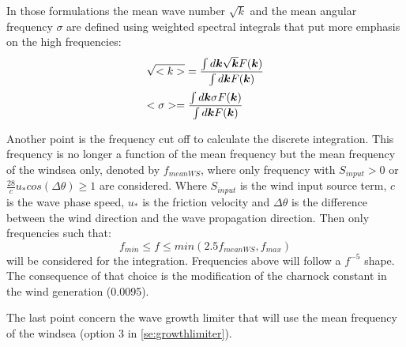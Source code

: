  In those formulations the mean wave number $\sqrt{k}$
 and the mean angular frequency $\sigma$ are defined using weighted spectral integrals that put more emphasis on the high frequencies:
$$
\barr{l}
\dsp \sqrt{<k>}=\frac{\int d \vec{k}\sqrt{\vec{k}}F(\vec{k})}{\int d \vec{k}F(\vec{k})} \\[12pt]
\dsp <\sigma>=\frac{\int d \vec{k}\sigma F(\vec{k})}{\int d \vec{k}F(\vec{k})}
\earr
$$

 Another point is the frequency cut off to calculate the discrete integration. This frequency is no longer a function of the mean frequency but the mean frequency of the windsea only, denoted by $f_{meanWS}$, where only frequency with $S_{input}>0$ or $\frac{28}{c}u_*cos(\Delta  \theta) \ge 1$  are considered. Where $S_{input}$ is the wind input source term, $c$ is the wave phase speed, $u_*$ is the friction velocity and $\Delta  \theta$ is the difference between the wind direction and the wave propagation direction. Then only frequencies such that:
$$
f_{min}\le f \le min(2.5 f_{meanWS},f_{max})
$$
 will be considered for the integration. Frequencies above will follow a $f^{-5}$ shape. The consequence of that choice is the modification of the charnock constant in the wind generation (0.0095).

 The last point concern the wave growth limiter that will use the mean frequency of the windsea (option 3 in \ref{se:growthlimiter}). 
